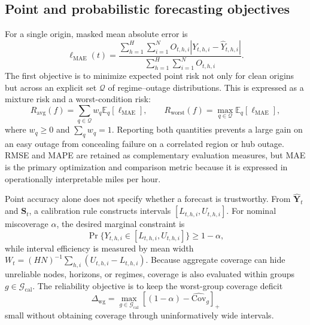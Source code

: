 \documentclass[preprint,12pt]{elsarticle}
\begin{document}
\subsection{Point and probabilistic forecasting objectives}
For a single origin, masked mean absolute error is
\begin{equation}
 \ell_{\mathrm{MAE}}(t)=
 \frac{\sum_{h=1}^{H}\sum_{i=1}^{N}O_{t,h,i}
 |Y_{t,h,i}-\widehat{Y}_{t,h,i}|}
 {\sum_{h=1}^{H}\sum_{i=1}^{N}O_{t,h,i}}.
 \label{eq:origin-mae}
\end{equation}
The first objective is to minimize expected point risk not only for clean
origins but across an explicit set $\mathcal{Q}$ of regime--outage
distributions. This is expressed as a mixture risk and a worst-condition risk:
\begin{equation}
 R_{\mathrm{avg}}(f)=\sum_{q\in\mathcal{Q}}w_q
 \mathbb{E}_{q}[\ell_{\mathrm{MAE}}],
 \qquad
 R_{\mathrm{worst}}(f)=\max_{q\in\mathcal{Q}}
 \mathbb{E}_{q}[\ell_{\mathrm{MAE}}],
 \label{eq:robust-risks}
\end{equation}
where $w_q\geq0$ and $\sum_qw_q=1$. Reporting both quantities prevents a large
gain on an easy outage from concealing failure on a correlated region or hub
outage. RMSE and MAPE are retained as complementary evaluation measures, but
MAE is the primary optimization and comparison metric because it is expressed
in operationally interpretable miles per hour.

Point accuracy alone does not specify whether a forecast is trustworthy. From
$\widehat{\mathbf{Y}}_t$ and $\mathbf{S}_t$, a calibration rule constructs
intervals $[L_{t,h,i},U_{t,h,i}]$. For nominal miscoverage $\alpha$, the desired
marginal constraint is
\begin{equation}
 \Pr\{Y_{t,h,i}\in[L_{t,h,i},U_{t,h,i}]\}\geq1-\alpha,
 \label{eq:coverage-target}
\end{equation}
while interval efficiency is measured by mean width
$W_t=(HN)^{-1}\sum_{h,i}(U_{t,h,i}-L_{t,h,i})$. Because aggregate coverage can
hide unreliable nodes, horizons, or regimes, coverage is also evaluated within
groups $g\in\mathcal{G}_{\mathrm{cal}}$. The reliability objective is to keep
the worst-group coverage deficit
\begin{equation}
 \Delta_{\mathrm{wg}}=
 \max_{g\in\mathcal{G}_{\mathrm{cal}}}
 \left[(1-\alpha)-\widehat{\mathrm{Cov}}_g\right]_{+}
 \label{eq:worst-group-gap}
\end{equation}
small without obtaining coverage through uninformatively wide intervals.
\end{document}
